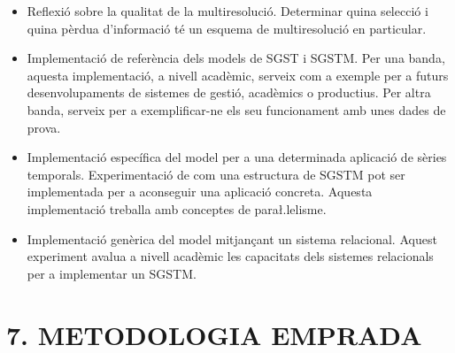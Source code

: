 \documentclass{article}
\begin{document}
\begin{itemize}
    

\item Reflexió sobre la qualitat de la multiresolució. Determinar
  quina selecció i quina pèrdua d'informació té un esquema de
  multiresolució en particular.



\item Implementació de referència dels models de SGST i SGSTM. Per una
  banda, aquesta implementació, a nivell acadèmic, serveix com a
  exemple per a futurs desenvolupaments de sistemes de gestió,
  acadèmics o productius. Per altra banda, serveix per a
  exemplificar-ne els seu funcionament amb unes dades de prova.

\item Implementació específica del model per a una determinada
  aplicació de sèries temporals. Experimentació de com una estructura
  de SGSTM pot ser implementada per a aconseguir una aplicació
  concreta. Aquesta implementació treballa amb conceptes de
  para\l.lelisme.

\item Implementació genèrica del model mitjançant un sistema
  relacional. Aquest experiment avalua a nivell acadèmic les capacitats dels sistemes relacionals per a implementar un SGSTM.




\end{itemize} 




\section*{7. METODOLOGIA EMPRADA}
\end{document}
